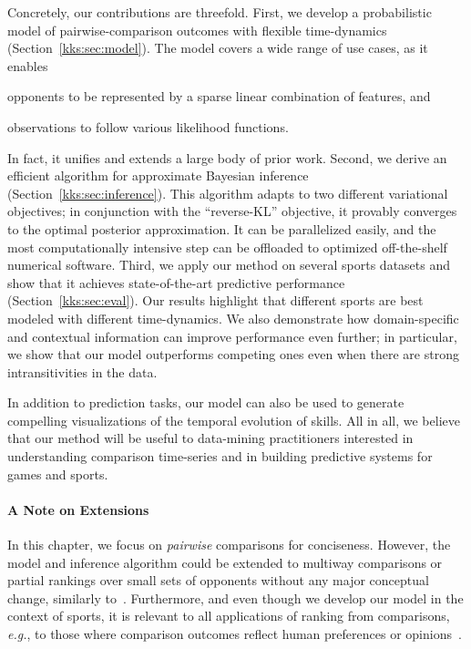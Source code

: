 Concretely, our contributions are threefold.
First, we develop a probabilistic model of pairwise-comparison outcomes with flexible time-dynamics (Section~\ref{kks:sec:model}).
The model covers a wide range of use cases, as it enables
\begin{enuminline}
	\item opponents to be represented by a sparse linear combination of features, and
	\item observations to follow various likelihood functions.
\end{enuminline}
In fact, it unifies and extends a large body of prior work.
Second, we derive an efficient algorithm for approximate Bayesian inference (Section~\ref{kks:sec:inference}).
This algorithm adapts to two different variational objectives;
in conjunction with the ``reverse-KL'' objective, it provably converges to the optimal posterior approximation.
It can be parallelized easily, and the most computationally intensive step can be offloaded to optimized off-the-shelf numerical software.
Third, we apply our method on several sports datasets and show that it achieves state-of-the-art predictive performance (Section~\ref{kks:sec:eval}).
Our results highlight that different sports are best modeled with different time-dynamics.
We also demonstrate how domain-specific and contextual information can improve performance even further;
in particular, we show that our model outperforms competing ones even when there are strong intransitivities in the data.

In addition to prediction tasks, our model can also be used to generate compelling visualizations of the temporal evolution of skills.
All in all, we believe that our method will be useful to data-mining practitioners interested in understanding comparison time-series and in building predictive systems for games and sports.

\paragraph{A Note on Extensions}
In this chapter, we focus on \emph{pairwise} comparisons for conciseness.
However, the model and inference algorithm could be extended to multiway comparisons or partial rankings over small sets of opponents without any major conceptual change, similarly to~\citet{herbrich2006trueskill}.
Furthermore, and even though we develop our model in the context of sports, it is relevant to all applications of ranking from comparisons, \textit{e.g.}, to those where comparison outcomes reflect human preferences or opinions~\citep{thurstone1927law, mcfadden1973conditional, salganik2015wiki}.
